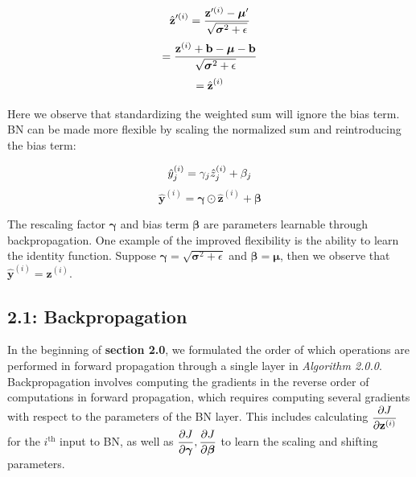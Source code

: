 \documentclass{article}
\begin{document}
\begin{multicols*}{2}
\begin{equation}
    \hat{\textbf{z}}'^{(i)} = {\textbf{z}'^{(i)} - \boldsymbol{\mu}' \over \sqrt{\boldsymbol{\sigma}^2 + \epsilon}} \notag
\end{equation}
\begin{equation}
    = {\textbf{z}^{(i)} + \textbf{b} - \boldsymbol{\mu} - \textbf{b} \over \sqrt{\boldsymbol{\sigma}^2 + \epsilon}} \notag
\end{equation}
\begin{equation}
    = \hat{\textbf{z}}^{(i)} \notag
\end{equation}

Here we observe that standardizing the weighted sum will ignore the bias
term. BN can be made more flexible by scaling the normalized sum and 
reintroducing the bias term:

\begin{equation}
    \hat{y}_j^{(i)} = \gamma_j \hat{z}_j^{(i)} + \beta_j \notag
\end{equation}
\begin{equation}
    \hat{\textbf{y}}^{(i)} = \boldsymbol{\gamma} \odot \hat{\textbf{z}}^{(i)} + \boldsymbol{\beta} 
\end{equation}

The rescaling factor $\boldsymbol{\gamma}$ and bias term $\boldsymbol{\beta}$ are 
parameters learnable through backpropagation. One example of the improved
flexibility is the ability to learn the identity function. Suppose $\boldsymbol{\gamma} = \sqrt{\boldsymbol{\sigma}^2 + \epsilon}$
and $\boldsymbol{\beta} = \boldsymbol{\mu}$, then we observe that $\hat{\textbf{y}}^{(i)} = \textbf{z}^{(i)}$.







\subsection*{2.1: Backpropagation}

In the beginning of \textbf{section 2.0}, we formulated the order of which
operations are performed in forward propagation through a single layer in \textit{Algorithm 2.0.0}. 
Backpropagation\cite{backprop} involves computing the gradients in the reverse order of 
computations in forward propagation, which
requires computing several gradients with respect to the parameters
of the BN layer. This includes calculating 
$\begin{aligned}
    {\partial J \over \partial \textbf{z}^{(i)}}
\end{aligned}$ for the $i^{\text{th}}$ input to BN, as well as $\begin{aligned}
    {\partial J \over \partial \boldsymbol{\gamma}}, {\partial J \over \partial \boldsymbol{\beta}}
\end{aligned}$ to learn the scaling and shifting parameters.


\end{multicols*}
\end{document}

